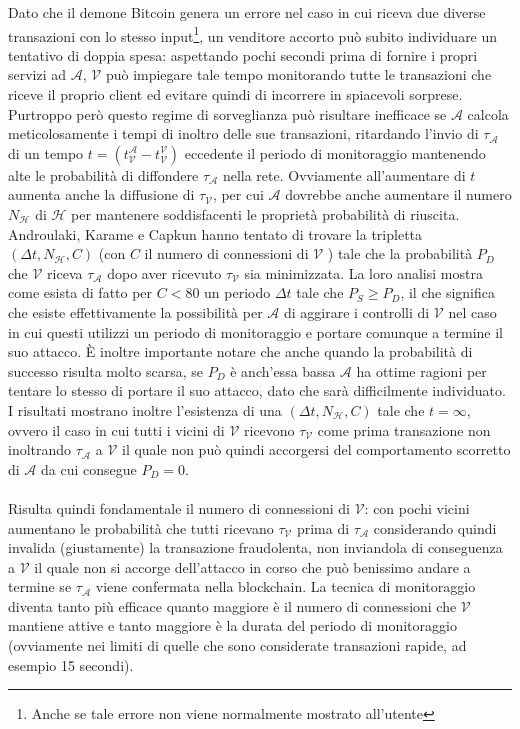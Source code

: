 Dato che il demone Bitcoin genera un errore nel caso in cui riceva due diverse transazioni con lo stesso input\footnote{Anche se tale errore non viene normalmente mostrato all'utente}, un venditore accorto può subito individuare un tentativo di doppia spesa: aspettando pochi secondi prima di fornire i propri servizi ad $\mathcal{A}$, $\mathcal{V}$ può impiegare tale tempo monitorando tutte le transazioni che riceve il proprio client ed evitare quindi di incorrere in spiacevoli sorprese.\\
Purtroppo però questo regime di sorveglianza può risultare inefficace se $\mathcal{A}$ calcola meticolosamente i tempi di inoltro delle sue transazioni, ritardando l'invio di $\tau_\mathcal{A}$ di un tempo $t=\left(t^\mathcal{A}_\mathcal{V} - t^\mathcal{V}_\mathcal{V}\right)$ eccedente il periodo di monitoraggio mantenendo alte le probabilità di diffondere $\tau_\mathcal{A}$ nella rete. Ovviamente all'aumentare di $t$ aumenta anche la diffusione di $\tau_\mathcal{V}$, per cui $\mathcal{A}$ dovrebbe anche aumentare il numero $N_\mathcal{H}$ di $\mathcal{H}$ per mantenere soddisfacenti le proprietà probabilità di riuscita. Androulaki, Karame e Capkun hanno tentato di trovare la tripletta $\left( \Delta t, N_\mathcal{H}, C \right)$ (con $C$ il numero di connessioni di $\mathcal{V}$ ) tale che la probabilità $P_D$ che $\mathcal{V}$ riceva $\tau_\mathcal{A}$ dopo aver ricevuto $\tau_\mathcal{V}$ sia minimizzata. La loro analisi mostra come esista di fatto per $C < 80$ un periodo $\Delta t$ tale che $P_S \geq P_D$, il che significa che esiste effettivamente la possibilità per $\mathcal{A}$ di aggirare i controlli di $\mathcal{V}$ nel caso in cui questi utilizzi un periodo di monitoraggio e portare comunque a termine il suo attacco. È inoltre importante notare che anche quando la probabilità di successo risulta molto scarsa, se $P_D$ è anch'essa bassa $\mathcal{A}$ ha ottime ragioni per tentare lo stesso di portare il suo attacco, dato che sarà difficilmente individuato. I risultati mostrano inoltre l'esistenza di una $\left( \Delta t, N_\mathcal{H}, C\right)$ tale che $t = \infty$, ovvero il caso in cui tutti i vicini di $\mathcal{V}$ ricevono $\tau_\mathcal{V}$ come prima transazione non inoltrando $\tau_\mathcal{A}$ a $\mathcal{V}$ il quale non può quindi accorgersi del comportamento scorretto di $\mathcal{A}$ da cui consegue $P_D = 0$.\\\\
Risulta quindi fondamentale il numero di connessioni di $\mathcal{V}$: con pochi vicini aumentano le probabilità che tutti ricevano $\tau_\mathcal{V}$ prima di $\tau_\mathcal{A}$ considerando quindi invalida (giustamente) la transazione fraudolenta, non inviandola di conseguenza a $\mathcal{V}$ il quale non si accorge dell'attacco in corso che può benissimo andare a termine se $\tau_\mathcal{A}$ viene confermata nella blockchain. La tecnica di monitoraggio diventa tanto più efficace quanto maggiore è il numero di connessioni che $\mathcal{V}$ mantiene attive e tanto maggiore è la durata del periodo di monitoraggio (ovviamente nei limiti di quelle che sono considerate transazioni rapide, ad esempio 15 secondi).

